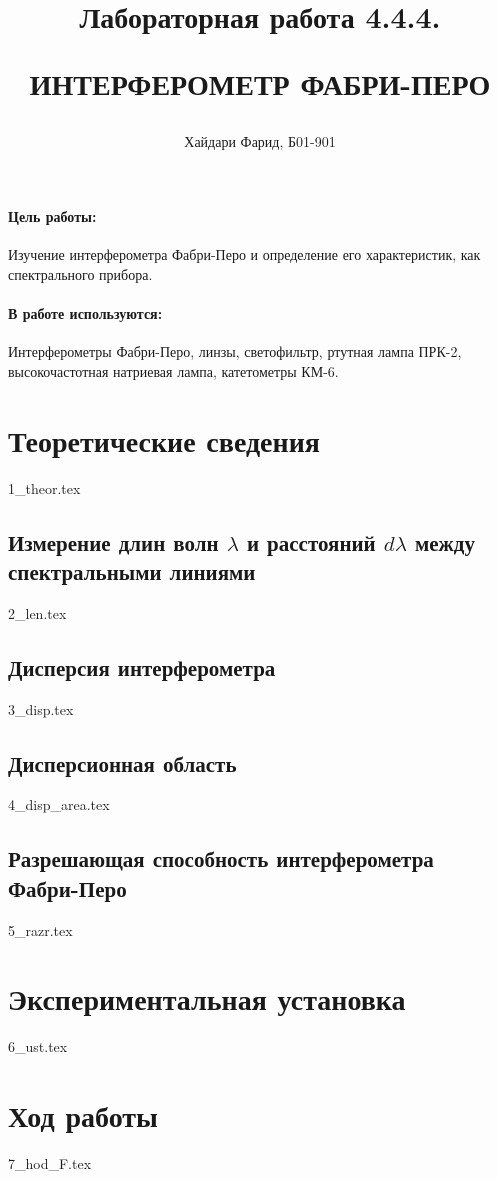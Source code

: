 \documentclass[a5paper,10pt, twoside]{article} %
\title
{
\hfill \break	\hfill \break
\hfill \break	\hfill \break
Лабораторная работа 4.4.4.

ИНТЕРФЕРОМЕТР ФАБРИ-ПЕРО
}
\author{Хайдари Фарид, Б01-901}
\begin{document}
\maketitle


\thispagestyle{empty} %

\newpage

\tableofcontents %
\thispagestyle{plain}
\newpage


\paragraph{Цель работы:}

Изучение интерферометра Фабри-Перо и определение его характеристик, как спектрального прибора.

\paragraph{В работе используются:}

Интерферометры Фабри-Перо, линзы, светофильтр, ртутная лампа ПРК-2, высокочастотная натриевая лампа,
катетометры КМ-6.

\section{Теоретические сведения}
{1_theor.tex}

  \subsection{Измерение длин волн $\lambda$ и расстояний $d \lambda$ между спектральными линиями}
  {2_len.tex}

  \subsection{Дисперсия интерферометра}
  {3_disp.tex}

  \subsection{Дисперсионная область}
  {4_disp_area.tex}

  \subsection{Разрешающая способность интерферометра Фабри-Перо}
  {5_razr.tex}

\section{Экспериментальная установка}
{6_ust.tex}

\section{Ход работы}
{7_hod_F.tex}
\end{document}
